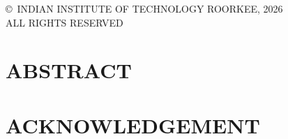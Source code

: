 \documentclass[12pt,twoside,openany]{report}
\begin{document}

\thispagestyle{empty}
\vspace*{\fill}
\begin{center}
\copyright\ INDIAN INSTITUTE OF TECHNOLOGY ROORKEE, 2026\\
ALL RIGHTS RESERVED
\end{center}
\vspace*{\fill}
\clearpage
{}

\chapter*{ABSTRACT}

\clearpage
\chapter*{ACKNOWLEDGEMENT}

\clearpage
\tableofcontents
\listoffigures
\listoftables
\clearpage
{}






\appendix




\end{document}
